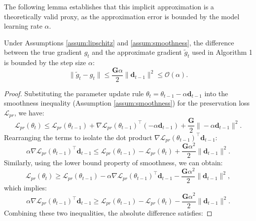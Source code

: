 The following lemma establishes that this implicit approximation is a theoretically valid proxy, as the approximation error is bounded by the model learning rate $\alpha$.

\begin{lemma}
\label{lemma:approx_error}
Under Assumptions \ref{assum:lipschitz} and \ref{assum:smoothness}, the difference between the true gradient $g_t$ and the approximate gradient $\tilde{g}_t$ used in Algorithm 1 is bounded by the step size $\alpha$:
\begin{equation}
    \| \tilde{g}_t - g_t \| \le \frac{\mathbf{G} \alpha}{2} \|\mathbf{d}_{t-1}\|^2 \le \mathcal{O}(\alpha).
\end{equation}
\end{lemma}

\begin{proof}
Substituting the parameter update rule $\theta_{t} = \theta_{t-1} - \alpha \mathbf{d}_{t-1}$ into the smoothness inequality (Assumption \ref{assum:smoothness}) for the preservation loss $\mathcal{L}_{pr}$, we have:
\begin{equation}
    \mathcal{L}_{pr}(\theta_{t}) \le \mathcal{L}_{pr}(\theta_{t-1}) + \nabla \mathcal{L}_{pr}(\theta_{t-1})^\top (-\alpha \mathbf{d}_{t-1}) + \frac{\mathbf{G}}{2} \|-\alpha \mathbf{d}_{t-1}\|^2.
\end{equation}
Rearranging the terms to isolate the dot product $\nabla \mathcal{L}_{pr}(\theta_{t-1})^\top \mathbf{d}_{t-1}$:
\begin{equation}
    \alpha \nabla \mathcal{L}_{pr}(\theta_{t-1})^\top \mathbf{d}_{t-1} \le \mathcal{L}_{pr}(\theta_{t-1}) - \mathcal{L}_{pr}(\theta_{t}) + \frac{\mathbf{G} \alpha^2}{2} \|\mathbf{d}_{t-1}\|^2.
\end{equation}
Similarly, using the lower bound property of smoothness, we can obtain:
\begin{equation}
    \mathcal{L}_{pr}(\theta_{t}) \ge \mathcal{L}_{pr}(\theta_{t-1}) - \alpha \nabla \mathcal{L}_{pr}(\theta_{t-1})^\top \mathbf{d}_{t-1} - \frac{\mathbf{G} \alpha^2}{2} \|\mathbf{d}_{t-1}\|^2,
\end{equation}
which implies:
\begin{equation}
    \alpha \nabla \mathcal{L}_{pr}(\theta_{t-1})^\top \mathbf{d}_{t-1} \ge \mathcal{L}_{pr}(\theta_{t-1}) - \mathcal{L}_{pr}(\theta_{t}) - \frac{\mathbf{G} \alpha^2}{2} \|\mathbf{d}_{t-1}\|^2.
\end{equation}
Combining these two inequalities, the absolute difference satisfies:

\end{proof}
